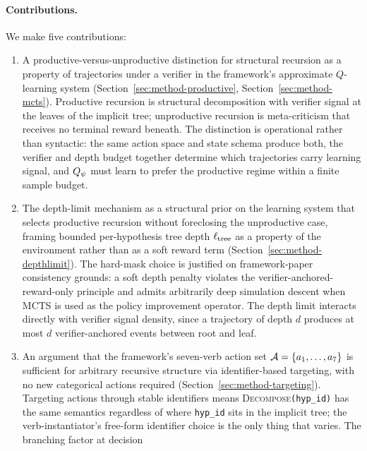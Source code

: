 \paragraph{Contributions.}
We make five contributions:
\begin{enumerate}[leftmargin=*]
  \item A productive-versus-unproductive distinction for structural
        recursion as a property of trajectories under a verifier in
        the framework's approximate $Q$-learning system
        (Section~\ref{sec:method-productive},
        Section~\ref{sec:method-mcts}). Productive recursion is
        structural decomposition with verifier signal at the leaves
        of the implicit tree; unproductive recursion is meta-criticism
        that receives no terminal reward beneath. The distinction is
        operational rather than syntactic: the same action space and
        state schema produce both, the verifier and depth budget
        together determine which trajectories carry learning signal,
        and $Q_{\psi}$ must learn to prefer the productive regime
        within a finite sample budget.
  \item The depth-limit mechanism as a structural prior on the
        learning system that selects productive recursion without
        foreclosing the unproductive case, framing bounded
        per-hypothesis tree depth $\ell_{\mathrm{tree}}$ as a property of the
        environment rather than as a soft reward term
        (Section~\ref{sec:method-depthlimit}). The hard-mask choice
        is justified on framework-paper consistency grounds: a soft
        depth penalty violates the verifier-anchored-reward-only
        principle and admits arbitrarily deep simulation descent
        when MCTS is used as the policy improvement operator. The
        depth limit interacts directly with verifier signal density,
        since a trajectory of depth $d$ produces at most $d$
        verifier-anchored events between root and leaf.
  \item An argument that the framework's seven-verb action set
        $\mathcal{A} = \{a_1, \ldots, a_7\}$ is sufficient for arbitrary
        recursive structure via identifier-based targeting, with no
        new categorical actions required
        (Section~\ref{sec:method-targeting}). Targeting actions
        through stable identifiers means
        \textsc{Decompose}\texttt{(hyp\_id)} has the same semantics
        regardless of where \texttt{hyp\_id} sits in the implicit
        tree; the verb-instantiator's free-form identifier choice is
        the only thing that varies. The branching factor at decision

\end{enumerate}
